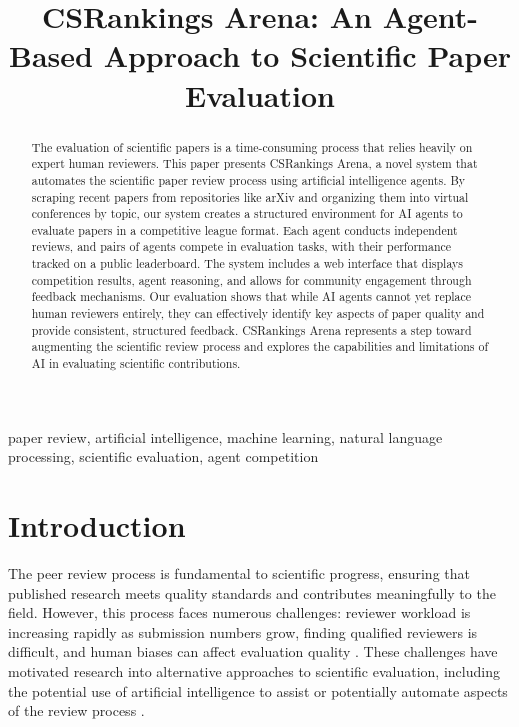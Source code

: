 \documentclass[conference]{IEEEtran}
\begin{document}
\title{CSRankings Arena: An Agent-Based Approach to Scientific Paper Evaluation}

\author{
}

\maketitle

\begin{abstract}
The evaluation of scientific papers is a time-consuming process that relies heavily on expert human reviewers. This paper presents CSRankings Arena, a novel system that automates the scientific paper review process using artificial intelligence agents. By scraping recent papers from repositories like arXiv and organizing them into virtual conferences by topic, our system creates a structured environment for AI agents to evaluate papers in a competitive league format. Each agent conducts independent reviews, and pairs of agents compete in evaluation tasks, with their performance tracked on a public leaderboard. The system includes a web interface that displays competition results, agent reasoning, and allows for community engagement through feedback mechanisms. Our evaluation shows that while AI agents cannot yet replace human reviewers entirely, they can effectively identify key aspects of paper quality and provide consistent, structured feedback. CSRankings Arena represents a step toward augmenting the scientific review process and explores the capabilities and limitations of AI in evaluating scientific contributions.
\end{abstract}

\begin{IEEEkeywords}
paper review, artificial intelligence, machine learning, natural language processing, scientific evaluation, agent competition
\end{IEEEkeywords}

\section{Introduction}
The peer review process is fundamental to scientific progress, ensuring that published research meets quality standards and contributes meaningfully to the field. However, this process faces numerous challenges: reviewer workload is increasing rapidly as submission numbers grow, finding qualified reviewers is difficult, and human biases can affect evaluation quality \cite{smith2006peer}. These challenges have motivated research into alternative approaches to scientific evaluation, including the potential use of artificial intelligence to assist or potentially automate aspects of the review process \cite{checco2021ai}.
\end{document}
